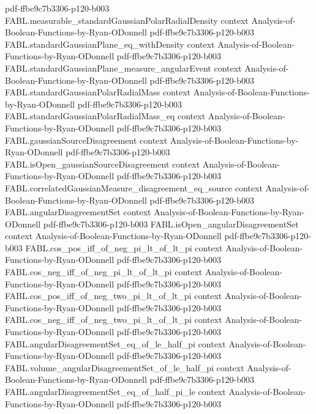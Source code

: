 \begin{theorem}
  {pdf-ffbe9c7b3306-p120-b003}
\proofstep
  {FABL.measurable_standardGaussianPolarRadialDensity}
  {context}
  {Analysis-of-Boolean-Functions-by-Ryan-ODonnell}
  {pdf-ffbe9c7b3306-p120-b003}
\proofstep
  {FABL.standardGaussianPlane_eq_withDensity}
  {context}
  {Analysis-of-Boolean-Functions-by-Ryan-ODonnell}
  {pdf-ffbe9c7b3306-p120-b003}
\proofstep
  {FABL.standardGaussianPlane_measure_angularEvent}
  {context}
  {Analysis-of-Boolean-Functions-by-Ryan-ODonnell}
  {pdf-ffbe9c7b3306-p120-b003}
\proofstep
  {FABL.standardGaussianPolarRadialMass}
  {context}
  {Analysis-of-Boolean-Functions-by-Ryan-ODonnell}
  {pdf-ffbe9c7b3306-p120-b003}
\proofstep
  {FABL.standardGaussianPolarRadialMass_eq}
  {context}
  {Analysis-of-Boolean-Functions-by-Ryan-ODonnell}
  {pdf-ffbe9c7b3306-p120-b003}
\proofstep
  {FABL.gaussianSourceDisagreement}
  {context}
  {Analysis-of-Boolean-Functions-by-Ryan-ODonnell}
  {pdf-ffbe9c7b3306-p120-b003}
\proofstep
  {FABL.isOpen_gaussianSourceDisagreement}
  {context}
  {Analysis-of-Boolean-Functions-by-Ryan-ODonnell}
  {pdf-ffbe9c7b3306-p120-b003}
\proofstep
  {FABL.correlatedGaussianMeasure_disagreement_eq_source}
  {context}
  {Analysis-of-Boolean-Functions-by-Ryan-ODonnell}
  {pdf-ffbe9c7b3306-p120-b003}
\proofstep
  {FABL.angularDisagreementSet}
  {context}
  {Analysis-of-Boolean-Functions-by-Ryan-ODonnell}
  {pdf-ffbe9c7b3306-p120-b003}
\proofstep
  {FABL.isOpen_angularDisagreementSet}
  {context}
  {Analysis-of-Boolean-Functions-by-Ryan-ODonnell}
  {pdf-ffbe9c7b3306-p120-b003}
\proofstep
  {FABL.cos_pos_iff_of_neg_pi_lt_of_lt_pi}
  {context}
  {Analysis-of-Boolean-Functions-by-Ryan-ODonnell}
  {pdf-ffbe9c7b3306-p120-b003}
\proofstep
  {FABL.cos_neg_iff_of_neg_pi_lt_of_lt_pi}
  {context}
  {Analysis-of-Boolean-Functions-by-Ryan-ODonnell}
  {pdf-ffbe9c7b3306-p120-b003}
\proofstep
  {FABL.cos_pos_iff_of_neg_two_pi_lt_of_lt_pi}
  {context}
  {Analysis-of-Boolean-Functions-by-Ryan-ODonnell}
  {pdf-ffbe9c7b3306-p120-b003}
\proofstep
  {FABL.cos_neg_iff_of_neg_two_pi_lt_of_lt_pi}
  {context}
  {Analysis-of-Boolean-Functions-by-Ryan-ODonnell}
  {pdf-ffbe9c7b3306-p120-b003}
\proofstep
  {FABL.angularDisagreementSet_eq_of_le_half_pi}
  {context}
  {Analysis-of-Boolean-Functions-by-Ryan-ODonnell}
  {pdf-ffbe9c7b3306-p120-b003}
\proofstep
  {FABL.volume_angularDisagreementSet_of_le_half_pi}
  {context}
  {Analysis-of-Boolean-Functions-by-Ryan-ODonnell}
  {pdf-ffbe9c7b3306-p120-b003}
\proofstep
  {FABL.angularDisagreementSet_eq_of_half_pi_le}
  {context}
  {Analysis-of-Boolean-Functions-by-Ryan-ODonnell}
  {pdf-ffbe9c7b3306-p120-b003}
\proofstep

\end{theorem}
